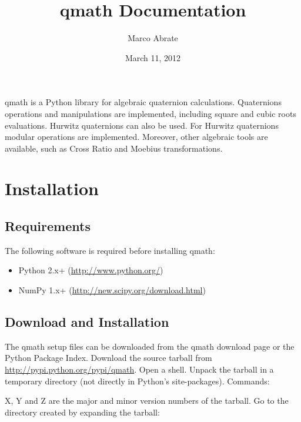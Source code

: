 \documentclass[letterpaper,10pt,english]{sphinxmanual}
\title{qmath Documentation}
\date{March 11, 2012}
\author{Marco Abrate}
\begin{document}
\maketitle
\tableofcontents
{}\label{index::doc}


qmath is a Python library for algebraic quaternion calculations. Quaternions operations and manipulations are implemented, including square and cubic roots evaluations.
Hurwitz quaternions can also be used. For Hurwitz quaternions modular operations are implemented.
Moreover, other algebraic tools are available, such as Cross Ratio and Moebius transformations.


\chapter{Installation}
\label{intro:installation}\label{intro::doc}\label{intro:qmath-s-documentation}

\section{Requirements}
\label{intro:requirements}
The following software is required before installing qmath:
\begin{itemize}
\item {} 
Python 2.x+ (\href{http://www.python.org/}{http://www.python.org/})

\item {} 
NumPy 1.x+ (\href{http://new.scipy.org/download.html}{http://new.scipy.org/download.html})

\end{itemize}


\section{Download and Installation}
\label{intro:download-and-installation}
The qmath setup files can be downloaded from the qmath download page or the Python Package Index. Download the source tarball from \href{http://pypi.python.org/pypi/qmath}{http://pypi.python.org/pypi/qmath}.
Open a shell. Unpack the tarball in a temporary directory (not directly in Python's site-packages). Commands:


X, Y and Z are the major and minor version numbers of the tarball.
Go to the directory created by expanding the tarball:

\end{document}
